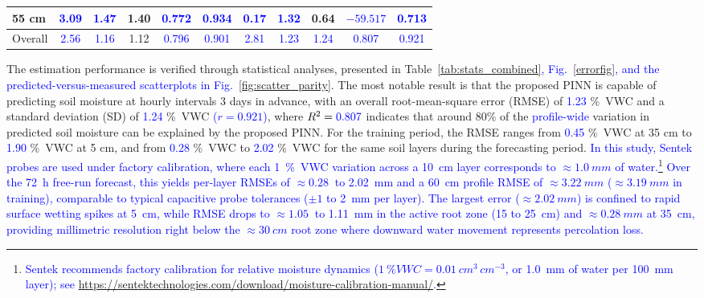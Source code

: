\documentclass[pdflatex,sn-nature]{sn-jnl}%
\theoremstyle{thmstyleone}%
\theoremstyle{thmstyletwo}%
\theoremstyle{thmstylethree}%
\begin{document}
\begin{table}[!htbp]
\begin{tabular}{@{}lcccccccccc@{}}
55 \si{cm} & \textcolor{blue}{3.09} & \textcolor{blue}{1.47} & 1.40 & \textcolor{blue}{0.772} & \textcolor{blue}{0.934} & \textcolor{blue}{0.17} & \textcolor{blue}{1.32} & 0.64 & \textcolor{blue}{$-59.517$} & \textcolor{blue}{0.713} \\
\midrule
Overall & \textcolor{blue}{2.56} & \textcolor{blue}{1.16} & 1.12 & \textcolor{blue}{0.796} & \textcolor{blue}{0.901} & \textcolor{blue}{2.81} & \textcolor{blue}{1.23} & \textcolor{blue}{1.24} & \textcolor{blue}{0.807} & \textcolor{blue}{0.921} \\
\bottomrule
\end{tabular}
\end{table}

The estimation performance is verified through statistical analyses, presented in Table~\ref{tab:stats_combined}\textcolor{blue}{, Fig.~\ref{errorfig}, and the predicted-versus-measured scatterplots in Fig.~\ref{fig:scatter_parity}}. The most notable result is that the proposed PINN is capable of predicting soil moisture at hourly intervals 3 days in advance, with an overall root-mean-square error (RMSE) of \textcolor{blue}{1.23} \si{\%VWC} and a standard deviation (SD) of \textcolor{blue}{1.24} \si{\%VWC} \textcolor{blue}{($r = 0.921$)}, where $R^2=\textcolor{blue}{0.807}$ indicates that around 80\% of the \textcolor{blue}{profile-wide} variation in predicted soil moisture can be explained by the proposed PINN.
For the training period, the RMSE ranges from \textcolor{blue}{0.45} \si{\%VWC} at 35 \si{cm} to \textcolor{blue}{1.90} \si{\%VWC} at 5 \si{cm}, and from \textcolor{blue}{0.28} \si{\%VWC} to \textcolor{blue}{2.02} \si{\%VWC} for the same soil layers during the forecasting period. \textcolor{blue}{In this study, Sentek probes are used under factory calibration, where each \SI{1}{\%VWC} variation across a \SI{10}{cm} layer corresponds to $\approx\SI{1.0}{mm}$ of water.}\footnote{\textcolor{blue}{Sentek recommends factory calibration for relative moisture dynamics ($\SI{1}{\%VWC} = \SI{0.01}{cm^3\,cm^{-3}}$, or \SI{1.0}{mm} of water per \SI{100}{mm} layer); see \url{https://sentektechnologies.com/download/moisture-calibration-manual/}.}} \textcolor{blue}{Over the 72~\si{h} free-run forecast, this yields per-layer RMSEs of $\approx\SI{0.28}{}$ to \SI{2.02}{mm} and a \SI{60}{cm} profile RMSE of $\approx\SI{3.22}{mm}$ ($\approx\SI{3.19}{mm}$ in training), comparable to typical capacitive probe tolerances ($\pm 1$ to \SI{2}{mm} per layer). The largest error ($\approx\SI{2.02}{mm}$) is confined to rapid surface wetting spikes at 5~\si{cm}, while RMSE drops to $\approx\SI{1.05}{}$ to \SI{1.11}{mm} in the active root zone (15 to 25~\si{cm}) and $\approx\SI{0.28}{mm}$ at 35~\si{cm}, providing millimetric resolution right below the $\approx\SI{30}{cm}$ root zone where downward water movement represents percolation loss.}
\end{document}
